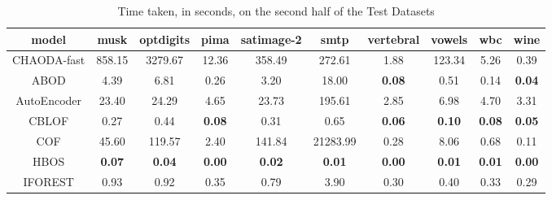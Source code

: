 \begin{table*}[!b]
\renewcommand{\arraystretch}{1.25}
\caption{Time taken, in seconds, on the second half of the Test Datasets}
\label{table:results:test-time-2}
\centering
\begin{tabular}{|c|c|c|c|c|c|c|c|c|c|}
\hline
\textbf{\textbf{model}} & \textbf{\textbf{musk}} & \textbf{\textbf{optdigits}} & \textbf{\textbf{pima}} & \textbf{\textbf{satimage-2}} & \textbf{\textbf{smtp}} & \textbf{\textbf{vertebral}} & \textbf{\textbf{vowels}} & \textbf{\textbf{wbc}} & \textbf{\textbf{wine}} \\
\hline
                CHAODA-fast &                 858.15 &                     3279.67 &                  12.36 &                       358.49 &                 272.61 &                        1.88 &                   123.34 &                  5.26 &                   0.39 \\
\hline
                        ABOD &                   4.39 &                        6.81 &                   0.26 &                         3.20 &                  18.00 &               \textbf{0.08} &                     0.51 &                  0.14 &          \textbf{0.04} \\
\hline
                AutoEncoder &                  23.40 &                       24.29 &                   4.65 &                        23.73 &                 195.61 &                        2.85 &                     6.98 &                  4.70 &                   3.31 \\
\hline
                        CBLOF &                   0.27 &                        0.44 &          \textbf{0.08} &                         0.31 &                   0.65 &               \textbf{0.06} &            \textbf{0.10} &         \textbf{0.08} &          \textbf{0.05} \\
\hline
                        COF &                  45.60 &                      119.57 &                   2.40 &                       141.84 &               21283.99 &                        0.28 &                     8.06 &                  0.68 &                   0.11 \\
\hline
                        HBOS &          \textbf{0.07} &               \textbf{0.04} &          \textbf{0.00} &                \textbf{0.02} &          \textbf{0.01} &               \textbf{0.00} &            \textbf{0.01} &         \textbf{0.01} &          \textbf{0.00} \\
\hline
                IFOREST &                   0.93 &                        0.92 &                   0.35 &                         0.79 &                   3.90 &                        0.30 &                     0.40 &                  0.33 &                   0.29 \\

\end{tabular}
\end{table*}
